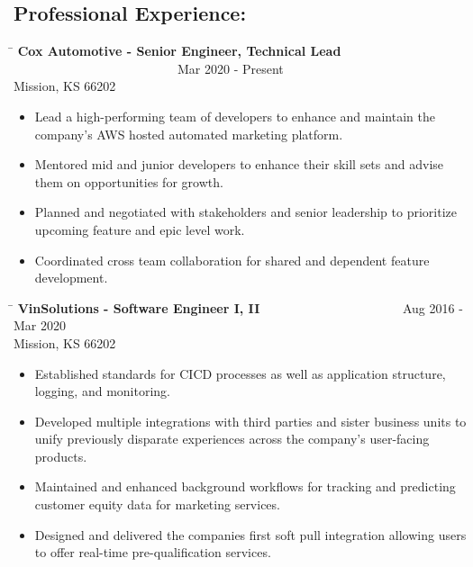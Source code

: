 \documentclass{res}
\begin{document}
\begin{resume}
\section{Professional Experience:}
	\begin{changemargin}{-0.25in}{0in}
	\begin{tabbing}
	\hspace{5.5in}\= \kill 
	{\bf Cox Automotive - Senior Engineer, Technical Lead} \>~~~~~~~~~~~~~~~~~~~~~~~~~~Mar 2020 - Present\\
	Mission, KS 66202
	\end{tabbing}\vspace{-1pt}
	\begin{itemize}
		\item Lead a high-performing team of developers to enhance and maintain the company’s AWS hosted automated marketing platform.
		\item Mentored mid and junior developers to enhance their skill sets and advise them on opportunities for growth.
		\item Planned and negotiated with stakeholders and senior leadership to prioritize upcoming feature and epic level work.
		\item Coordinated cross team collaboration for shared and dependent feature development.\vspace{-15pt}
	\end{itemize}
	\vspace{0.2in}
	\begin{tabbing}
   \hspace{5.5in}\= \kill 
    {\bf VinSolutions - Software Engineer I, II} \>~~~~~~~~~~~~~~~~~~~~~~Aug 2016 - Mar 2020\\
    Mission, KS 66202
	\end{tabbing}\vspace{-1pt}
	\begin{itemize}
		\item Established standards for CICD processes as well as application structure, logging, and monitoring.
		\item Developed multiple integrations with third parties and sister business units to unify previously disparate experiences across the company's user-facing products.
		\item Maintained and enhanced background workflows for tracking and predicting customer equity data for marketing services.
		\item Designed and delivered the companies first soft pull integration allowing users to offer real-time pre-qualification services.

\end{itemize}
\end{changemargin}
\end{resume}
\end{document}
